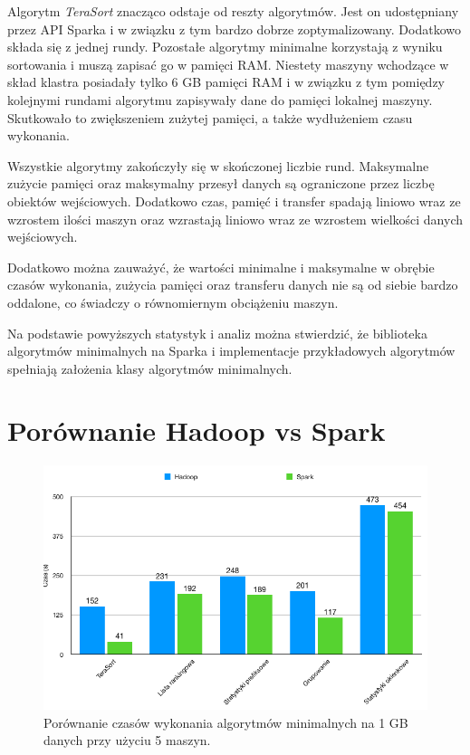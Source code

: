 \documentclass[licencjacka]{pracamgr}
\begin{document}
Algorytm \textit{TeraSort} znacząco odstaje od reszty algorytmów. Jest on udostępniany przez API Sparka i w związku z tym bardzo dobrze zoptymalizowany. Dodatkowo składa się z jednej rundy. Pozostałe algorytmy minimalne korzystają z wyniku sortowania i muszą zapisać go w pamięci RAM. Niestety maszyny wchodzące w skład klastra posiadały tylko 6 GB pamięci RAM i w związku z tym pomiędzy kolejnymi rundami algorytmu zapisywały dane do pamięci lokalnej maszyny. Skutkowało to zwiększeniem zużytej pamięci, a także wydłużeniem czasu wykonania.

Wszystkie algorytmy zakończyły się w skończonej liczbie rund. Maksymalne zużycie pamięci oraz maksymalny przesył danych są ograniczone przez liczbę obiektów wejściowych. Dodatkowo czas, pamięć i transfer spadają liniowo wraz ze wzrostem ilości maszyn oraz wzrastają liniowo wraz ze wzrostem wielkości danych wejściowych.

Dodatkowo można zauważyć, że wartości minimalne i maksymalne w obrębie czasów wykonania, zużycia pamięci oraz transferu danych nie są od siebie bardzo oddalone, co świadczy o równomiernym obciążeniu maszyn.

Na podstawie powyższych statystyk i analiz można stwierdzić, że biblioteka algorytmów minimalnych na Sparka i implementacje przykładowych algorytmów spełniają założenia klasy algorytmów minimalnych.

\section{Porównanie Hadoop vs Spark}

\begin{figure}[H]
\centering
  \caption{Porównanie czasów wykonania algorytmów minimalnych na 1 GB danych przy użyciu 5 maszyn.}
  \includegraphics[width=13cm]{1_5_execution.png}
\end{figure}
\end{document}
